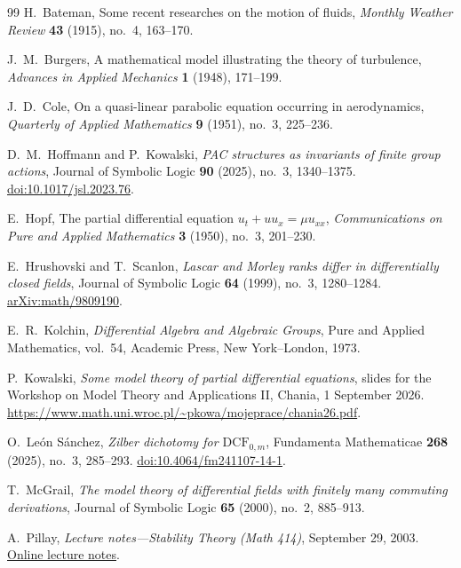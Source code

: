 \documentclass[11pt,a4paper]{amsart}
\theoremstyle{definition}
\begin{document}
\begin{thebibliography}{99}
H.~Bateman,
Some recent researches on the motion of fluids,
\emph{Monthly Weather Review}
\textbf{43} (1915), no.~4, 163--170.

J.~M.~Burgers,
A mathematical model illustrating the theory of turbulence,
\emph{Advances in Applied Mechanics}
\textbf{1} (1948), 171--199.

J.~D.~Cole,
On a quasi-linear parabolic equation occurring in aerodynamics,
\emph{Quarterly of Applied Mathematics}
\textbf{9} (1951), no.~3, 225--236.

D.~M.~Hoffmann and P.~Kowalski,
\emph{PAC structures as invariants of finite group actions},
Journal of Symbolic Logic \textbf{90} (2025), no.~3,
1340--1375.
\href{https://doi.org/10.1017/jsl.2023.76}
{doi:10.1017/jsl.2023.76}.

E.~Hopf,
The partial differential equation $u_t+uu_x=\mu u_{xx}$,
\emph{Communications on Pure and Applied Mathematics}
\textbf{3} (1950), no.~3, 201--230.

E.~Hrushovski and T.~Scanlon,
\emph{Lascar and Morley ranks differ in differentially closed fields},
Journal of Symbolic Logic \textbf{64} (1999), no.~3, 1280--1284.
\href{https://arxiv.org/abs/math/9809190}{arXiv:math/9809190}.

E.~R.~Kolchin,
\emph{Differential Algebra and Algebraic Groups},
Pure and Applied Mathematics, vol.~54,
Academic Press, New York--London, 1973.

P.~Kowalski,
\emph{Some model theory of partial differential equations},
slides for the Workshop on Model Theory and Applications II,
Chania, 1 September 2026.
\url{https://www.math.uni.wroc.pl/~pkowa/mojeprace/chania26.pdf}.

O.~Le\'on S\'anchez,
\emph{Zilber dichotomy for $\mathrm{DCF}_{0,m}$},
Fundamenta Mathematicae \textbf{268} (2025), no.~3, 285--293.
\href{https://doi.org/10.4064/fm241107-14-1}
{doi:10.4064/fm241107-14-1}.

T.~McGrail,
\emph{The model theory of differential fields with finitely many
commuting derivations},
Journal of Symbolic Logic \textbf{65} (2000), no.~2, 885--913.

A.~Pillay,
\emph{Lecture notes---Stability Theory (Math 414)},
September 29, 2003.
\href{https://academicweb.nd.edu/~apillay/pdf/lecturenotes.stability.pdf}
{Online lecture notes}.


\end{thebibliography}
\end{document}
